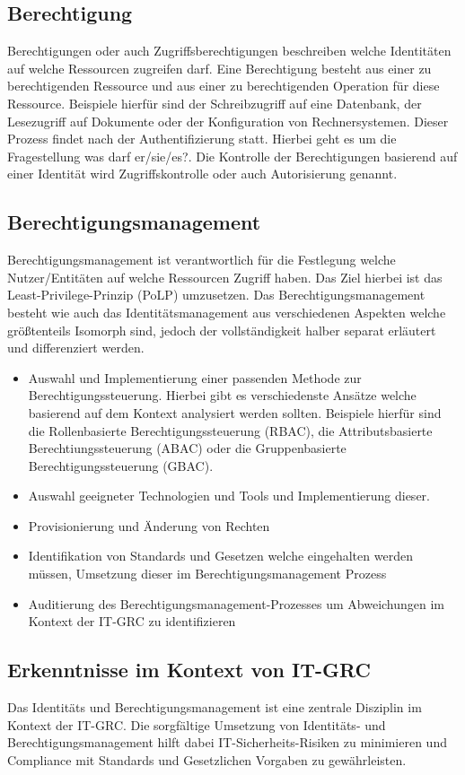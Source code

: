 \documentclass[10pt]{article}
\begin{document}
\subsection{Berechtigung}
Berechtigungen oder auch Zugriffsberechtigungen beschreiben welche Identitäten auf welche Ressourcen zugreifen darf. Eine Berechtigung besteht aus einer zu berechtigenden Ressource und aus einer zu berechtigenden Operation für diese Ressource. Beispiele hierfür sind der Schreibzugriff auf eine Datenbank, der Lesezugriff auf Dokumente oder der Konfiguration von Rechnersystemen. Dieser Prozess findet nach der Authentifizierung statt. Hierbei geht es um die Fragestellung \glqq{}was darf er/sie/es?\grqq{}. Die Kontrolle der Berechtigungen basierend auf einer Identität wird Zugriffskontrolle oder auch Autorisierung genannt.~\cite{tsolkas2017}
\subsection{Berechtigungsmanagement}
Berechtigungsmanagement ist verantwortlich für die Festlegung welche Nutzer/Entitäten auf welche Ressourcen Zugriff haben. Das Ziel hierbei ist das Least-Privilege-Prinzip (PoLP) umzusetzen. Das Berechtigungsmanagement besteht wie auch das Identitätsmanagement aus verschiedenen Aspekten welche größtenteils Isomorph sind, jedoch der vollständigkeit halber separat erläutert und differenziert werden.
\begin{itemize}
  \item Auswahl und Implementierung einer passenden Methode zur Berechtigungssteuerung. Hierbei gibt es verschiedenste Ansätze welche basierend auf dem Kontext analysiert werden sollten. Beispiele hierfür sind die Rollenbasierte Berechtigungssteuerung (RBAC), die Attributsbasierte Berechtiungssteuerung (ABAC) oder die Gruppenbasierte Berechtigungssteuerung (GBAC).
  \item Auswahl geeigneter Technologien und Tools und Implementierung dieser.
  \item Provisionierung und Änderung von Rechten
  \item Identifikation von Standards und Gesetzen welche eingehalten werden müssen, Umsetzung dieser im Berechtigungsmanagement Prozess
  \item Auditierung des Berechtigungsmanagement-Prozesses um Abweichungen im Kontext der IT-GRC zu identifizieren
\end{itemize}
\subsection{Erkenntnisse im Kontext von IT-GRC}
Das Identitäts und Berechtigungsmanagement ist eine zentrale Disziplin im Kontext der IT-GRC. Die sorgfältige Umsetzung von Identitäts- und Berechtigungsmanagement hilft dabei IT-Sicherheits-Risiken zu minimieren und Compliance mit Standards und Gesetzlichen Vorgaben zu gewährleisten.
\end{document}
